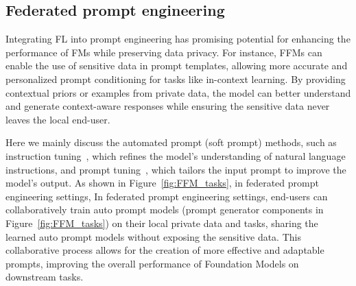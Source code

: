 


\subsection{Federated prompt engineering}
Integrating FL into prompt engineering has promising potential for enhancing the performance of FMs while preserving data privacy. For instance, FFMs can enable the use of sensitive data in prompt templates, allowing more accurate and personalized prompt conditioning for tasks like in-context learning. By providing contextual priors or examples from private data, the model can better understand and generate context-aware responses while ensuring the sensitive data never leaves the local end-user.

Here we mainly discuss the automated prompt (soft prompt) methods, such as instruction tuning~\cite{wei2021prompt}, which refines the model's understanding of natural language instructions, and prompt tuning~\cite{lester2021prompt_tune}, which tailors the input prompt to improve the model's output. As shown in Figure~\ref{fig:FFM_tasks}, in federated prompt engineering settings, 
In federated prompt engineering settings, end-users can collaboratively train auto prompt models (prompt generator components in Figure~\ref{fig:FFM_tasks}) on their local private data and tasks, sharing the learned auto prompt models without exposing the sensitive data. 
This collaborative process allows for the creation of more effective and adaptable prompts, improving the overall performance of Foundation Models on downstream tasks.


